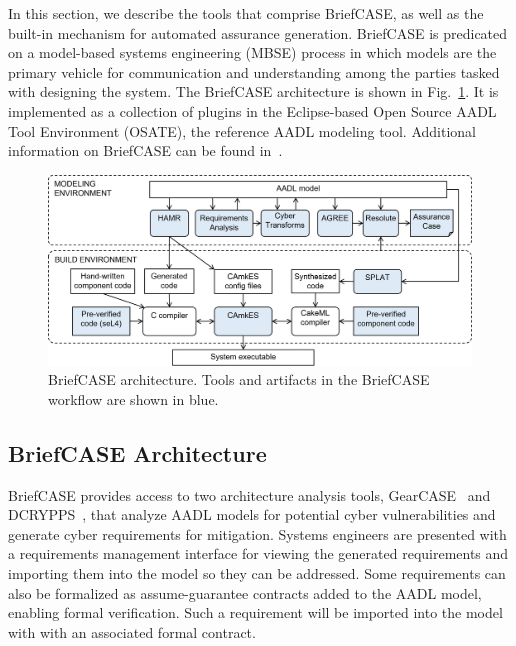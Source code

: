 In this section, we describe the tools that comprise BriefCASE, as well as the built-in mechanism for automated assurance generation.
BriefCASE is predicated on a model-based systems engineering (MBSE) process in which models are the primary vehicle for communication and understanding among the parties tasked with designing the system. 
The BriefCASE architecture is shown in Fig.~\ref{fig:briefcase-architecture}.
It is implemented as a collection of plugins in the Eclipse-based Open Source AADL Tool Environment (OSATE), the reference AADL modeling tool.   
Additional information on BriefCASE can be found in~\cite{case-at-scale}.

\begin{figure}[h] 
	\centering 
	\includegraphics[width=\textwidth]{figs/briefcase-architecture.png}
	\caption{BriefCASE architecture. Tools and artifacts in the BriefCASE workflow are shown in blue.}
	\label{fig:briefcase-architecture} 
\end{figure}

\subsection{BriefCASE Architecture}

BriefCASE provides access to two architecture analysis tools, GearCASE~\cite{gearcase2020} and DCRYPPS~\cite{dcrypps2019}, that analyze AADL models for potential cyber vulnerabilities and generate cyber requirements for mitigation. 
Systems engineers are presented with a requirements management interface for viewing the generated requirements and importing them into the model so they can be addressed.  
Some requirements can also be formalized as assume-guarantee contracts added to the AADL model, enabling formal verification. Such a requirement will be imported into the model with with an associated formal contract.

